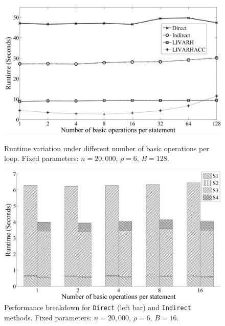 \documentclass[12pt]{article}
\begin{document}
\begin{figure}[htbp]
\centering
\begin{minipage}[b]{0.48\linewidth}
\includegraphics[width=1\textwidth]{figures/HRfig1BW}
\caption[ Runtime Variation under Different Number of Basic Operations per Loop]
{Runtime variation under different number of basic operations per loop.
Fixed parameters: $n=20,000$, $\overline{\rho} = 6$, $B=128$. }
\label{fig:random-fig1}
\end{minipage}
\quad
\begin{minipage}[b]{0.48\linewidth}
\includegraphics[width=1\textwidth]{figures/HRfig2BW}
\caption[Performance Breakdown for {\tt Direct} and {\tt Indirect} under Varying Number of Basic Operations per Loop]
{Performance breakdown for {\tt Direct} (left bar) and {\tt Indirect} methods. 
Fixed parameters: $n=20,000$, $\overline{\rho} = 6$, $B=16$. }
\label{fig:random-fig2}
\end{minipage}
\end{figure}
\end{document}
